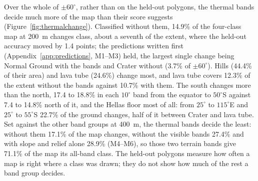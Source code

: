 \documentclass[twocolumn]{aastex701}
\newcommand{\pmsixty}{$\pm60^{\circ}$}
\begin{document}
Over the whole of \pmsixty, rather than on the held-out polygons, the thermal bands decide much more of the map than
their score suggests (Figure~\ref{fig:thermalchange}). Classified without them, 14.9\% of the four-class map at
200~m changes class, about a seventh of the extent, where the held-out accuracy moved by 1.4 points; the predictions
written first (Appendix~\ref{app:predictions}, M1--M3) held, the largest single change being Normal Ground with the
bands and Crater without (3.7\% of \pmsixty). Hills (44.4\% of their area) and lava tube (24.6\%) change most, and
lava tube covers 12.3\% of the extent without the bands against 10.7\% with them. The south changes more than the
north, 17.4 to 18.8\% in each $10^{\circ}$ band from the equator to $50^{\circ}$S against 7.4 to 14.8\% north of it,
and the Hellas floor most of all: from $25^{\circ}$ to $115^{\circ}$E and $25^{\circ}$ to $55^{\circ}$S 22.7\% of the
ground changes, half of it between Crater and lava tube. Set against the other band groups at 400~m, the thermal
bands decide the least: without them 17.1\% of the map changes, without the visible bands 27.4\% and with slope and
relief alone 28.9\% (M4--M6), so those two terrain bands give 71.1\% of the map its all-band class. The held-out
polygons measure how often a map is right where a class was drawn; they do not show how much of the rest a band
group decides. %
\end{document}
